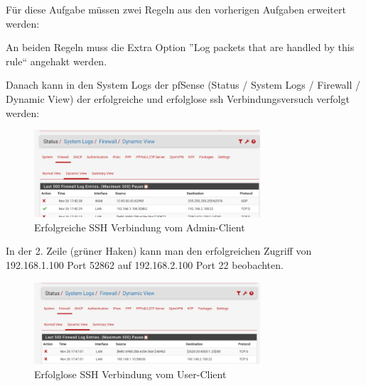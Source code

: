 \documentclass{article}
\begin{document}
Für diese Aufgabe müssen zwei Regeln aus den vorherigen Aufgaben erweitert werden:

\begin{center}
\end{center}

An beiden Regeln muss die Extra Option ''Log packets that are handled by this rule`` 
angehakt werden.

Danach kann in den System Logs der pfSense (Status / System Logs / Firewall / Dynamic 
View) der erfolgreiche und erfolglose ssh Verbindungsversuch verfolgt werden:

\begin{figure}[H]
	\includegraphics[width=0.75\textwidth]{images/13}
	\centering
	\caption{Erfolgreiche SSH Verbindung vom Admin-Client}
\end{figure}

In der 2. Zeile (grüner Haken) kann man den erfolgreichen Zugriff von 192.168.1.100 
Port 52862 auf 192.168.2.100 Port 22 beobachten.

\begin{figure}[H]
	\includegraphics[width=0.75\textwidth]{images/14}
	\centering
	\caption{Erfolglose SSH Verbindung vom User-Client}
\end{figure}
\end{document}
